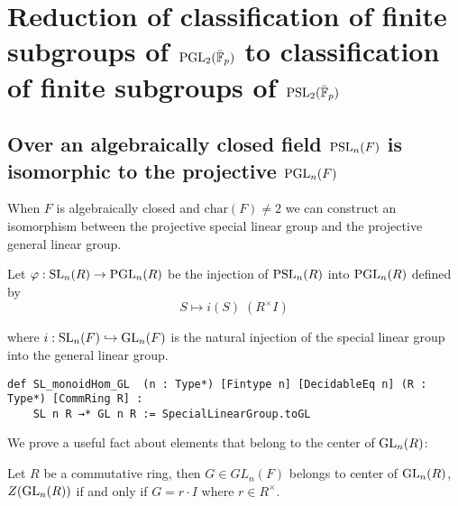 \chapter{Reduction of classification of finite subgroups of $\operatorname{PGL}_2(\bar{\mathbb{F}}_p)$ to classification of finite subgroups of $\operatorname{PSL}_2(\bar{\mathbb{F}}_p)$}\label{Ch4_ReductionOfProblem}

\section{Over an algebraically closed field $\operatorname{PSL}_n(F)$ is isomorphic to the projective $\operatorname{PGL}_n(F)$}


When $F$ is algebraically closed and $\textrm{char}(F) \neq 2$ we can construct an isomorphism between the projective special linear group and the projective general linear group.
\begin{definition}
\label{SL_monoidHom_PGL}
\leanok
    Let $\varphi : \operatorname{SL}_n(R) \rightarrow \operatorname{PGL}_n(R)$ be the injection of $\operatorname{PSL}_n(R)$ into $\operatorname{PGL}_n(R)$ defined by
    \[
     S \mapsto i(S) \;  (R^\times I) 
    \]

    where $i : \operatorname{SL}_n(F) \hookrightarrow \operatorname{GL}_n(F)$ is the natural injection of the special linear group into the general linear group.
\end{definition}
\begin{footnotesize}
\begin{verbatim}
def SL_monoidHom_GL  (n : Type*) [Fintype n] [DecidableEq n] (R : Type*) [CommRing R] :
    SL n R →* GL n R := SpecialLinearGroup.toGL
\end{verbatim}
\end{footnotesize}


We prove a useful fact about elements that belong to the center of $\operatorname{GL}_n(R)$:

\begin{lemma}
    \label{GeneralLinearGroup.mem_center_general_linear_group_iff}
    \leanok
     Let $R$ be a commutative ring, then $G \in GL_n(F)$ belongs to center of $\operatorname{GL}_n(R)$, $Z(\operatorname{GL}_n(R))$ if and only if $G = r \cdot I$ where $r \in R^\times$.
    \end{lemma}
    
